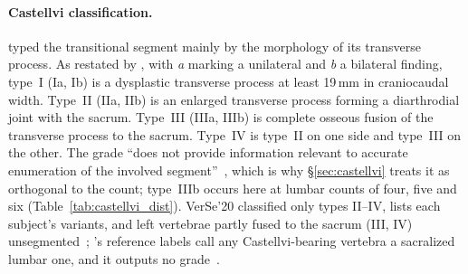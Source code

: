 \paragraph{Castellvi classification.}
\citet{Castellvi1984LumbosacralDefects} typed the transitional segment mainly by the
morphology of its transverse process. As restated by \citet{Konin2010LumbosacralRelevance}, with \emph{a} marking a
unilateral and \emph{b} a bilateral finding, type~I (Ia, Ib) is a dysplastic transverse
process at least 19\,mm in craniocaudal width. Type~II (IIa, IIb) is an enlarged transverse process forming a
diarthrodial joint with the sacrum. Type~III (IIIa, IIIb) is complete osseous fusion of the
transverse process to the sacrum. Type~IV is type~II on one side and type~III on the other.
The grade ``does not provide information relevant to accurate enumeration of the involved
segment''~\citep[p.~1778]{Konin2010LumbosacralRelevance}, which is why \S\ref{sec:castellvi}
treats it as orthogonal to the count; type~IIIb occurs here at lumbar counts of four, five
and six (Table~\ref{tab:castellvi_dist}). VerSe'20 classified only types II--IV, lists each
subject's variants, and left vertebrae partly fused to the sacrum (III, IV)
unsegmented~\citep{Liebl2021VerSeData}; \VERIDAH{}'s reference labels
call any Castellvi-bearing vertebra a sacralized lumbar one, and it outputs no
grade~\citep{Moller2026VERIDAH:Sequences}.

